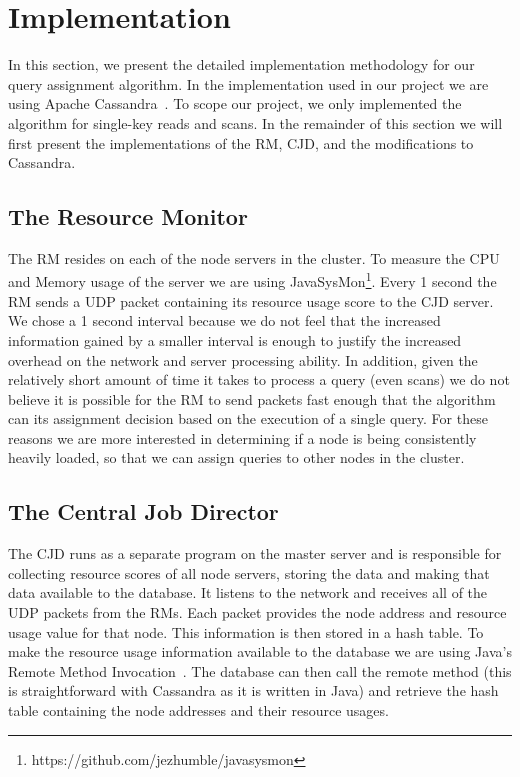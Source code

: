 \section{Implementation}
\label{sec:implementation}
In this section, we present the detailed implementation methodology for our query assignment algorithm. In the implementation used in our project we are using Apache Cassandra~\cite{ Lakshman:2010:CDS:1773912.1773922}. To scope our project, we only implemented the algorithm for single-key reads and scans. In the remainder of this section we will first present the implementations of the RM, CJD, and the modifications to Cassandra.

\subsection{The Resource Monitor}
The RM resides on each of the node servers in the cluster. To measure the CPU and Memory usage of the server we are using JavaSysMon\footnote{https://github.com/jezhumble/javasysmon}. Every 1 second the RM sends a UDP packet containing its resource usage score to the CJD server. We chose a 1 second interval because we do not feel that the increased information gained by a smaller interval is enough to justify the increased overhead on the network and server processing ability. In addition, given the relatively short amount of time it takes to process a query (even scans) we do not believe it is possible for the RM to send packets fast enough that the algorithm can its assignment decision based on the execution of a single query. For these reasons we are more interested in determining if a node is being consistently heavily loaded, so that we can assign queries to other nodes in the cluster.

\subsection{The Central Job Director}
The CJD runs as a separate program on the master server and is responsible for collecting resource scores of all node servers, storing the data and making that data available to the database. It listens to the network and receives all of the UDP packets from the RMs. Each packet provides the node address and resource usage value for that node. This information is then stored in a hash table. To make the resource usage information available to the database we are using Java's Remote Method Invocation~\cite{JavaRMI}. The database can then call the remote method (this is straightforward with Cassandra as it is written in Java) and retrieve the hash table containing the node addresses and their resource usages.

